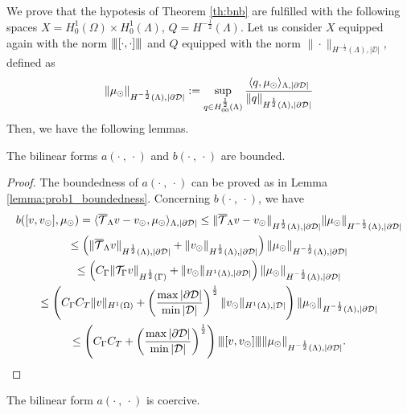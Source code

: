 We prove that the hypotesis of  Theorem \ref{th:bnb} are fulfilled with the following spaces $X=H^1_0(\Omega) \times H^1_0(\Lambda)$, $Q=H^{-\frac 12}(\Lambda)$.
Let us consider $X$ equipped again with the norm ${\left\vert\kern-0.25ex\left\vert\kern-0.25ex\left\vert [\cdot,\cdot ] \right\vert\kern-0.25ex\right\vert\kern-0.25ex\right\vert}$ and  
$Q$ equipped with the norm $\|\cdot \|_{H^{-\frac 12}(\Lambda),|\DD|}$, defined as
\begin{equation*}
\|\mu_{\odot} \|_{H^{-\frac 12}(\Lambda),|\partial\mathcal{D}|}:= \sup_{q\in H^{\frac 12}_{00}(\Lambda)}\frac{\langle q, \mu_{\odot}\rangle_{\Lambda, |\partial\mathcal{D}|}}{\|q\|_{H^{\frac 12}(\Lambda),|\partial\mathcal{D}|}}
\end{equation*}
Then, we have the following lemmas.
\begin{lemma}
The bilinear forms $a(\cdot \ , \ \cdot)$ and $b(\cdot \ , \ \cdot)$ are bounded.
\end{lemma}
\begin{proof}
The boundedness of $a(\cdot \ , \ \cdot)$ can be proved as in Lemma \ref{lemma:prob1_boundedness}. Concerning $b(\cdot \ , \ \cdot)$, we have
\begin{multline*}
b([v, v_{\odot}], \mu_{\odot})=  \langle  {\overline{\mathcal{T}}_\Lambda} v - v_{\odot}, \mu_{\odot} \rangle_{\Lambda, |\partial\mathcal{D}|} 
\leq \|{\overline{\mathcal{T}}_\Lambda} v - v_{\odot}\|_{H^{\frac 12 }(\Lambda), |\partial\mathcal{D}|}\|\mu_{\odot}\|_{H^{-\frac 12}(\Lambda),|\partial\mathcal{D}|}\\
\leq \left(\|{\overline{\mathcal{T}}_\Lambda} v\|_{H^{\frac 12 }(\Lambda), |\partial\mathcal{D}|}+\|v_{\odot}\|_{H^{\frac 12 }(\Lambda), |\partial\mathcal{D}|}\right)\|\mu_{\odot}\|_{H^{-\frac 12}(\Lambda),|\partial\mathcal{D}|} \\
\leq \left(C_\Gamma \|{\mathcal{T}_\Gamma} v\|_{H^{\frac 12 }(\Gamma)}+ \|v_{\odot}\|_{H^1(\Lambda), |\partial\mathcal{D}|}\right)\|\mu_{\odot}\|_{H^{-\frac 12}(\Lambda),|\partial\mathcal{D}|} \\
\leq \left(C_\Gamma C_T\|v\|_{H^1(\Omega)}+ \left(\frac{\max |\partial\mathcal{D}|}{\min |\mathcal{D}|}\right)^{\frac 12} \|v_{\odot}\|_{H^1(\Lambda), |\mathcal{D}|}\right) \|\mu_{\odot}\|_{H^{-\frac 12}(\Lambda),|\partial\mathcal{D}|} \\
\leq  \left( C_\Gamma C_T + \left(\frac{\max |\partial\mathcal{D}|}{\min |\mathcal{D}|}\right)^{\frac 12} \right) {\left\vert\kern-0.25ex\left\vert\kern-0.25ex\left\vert [v,v_{\odot}] \right\vert\kern-0.25ex\right\vert\kern-0.25ex\right\vert}\|\mu_{\odot}\|_{H^{-\frac 12}(\Lambda),|\partial\mathcal{D}|}.
\end{multline*} 
\end{proof}

\begin{lemma}\label{lemma:prob2_coercivity}
The bilinear form $a(\cdot \ , \ \cdot)$ is coercive.
\end{lemma}

